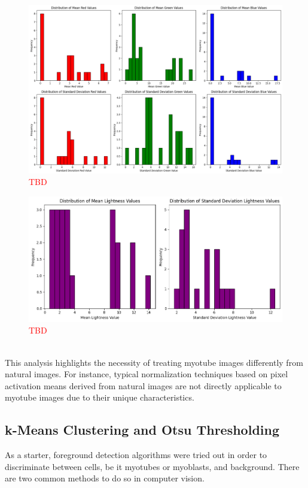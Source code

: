 \begin{figure}
	\centering
	\includegraphics[width=\textwidth]{"images/pixel_distribution_plots_rgb.png"}
	\caption[TBD]{\textcolor{red}{TBD}}
	\label{fig2}
\end{figure}
\begin{figure}
	\centering
	\includegraphics[width=\textwidth]{"images/pixel_distribution_plots_hsl.png"}
	\caption[TBD]{\textcolor{red}{TBD}}
	\label{fig3}
\end{figure}
\ \\
This analysis highlights the necessity of treating myotube images differently from natural images. For instance, typical normalization techniques based on pixel activation means derived from natural images are not directly applicable to myotube images due to their unique characteristics.

\subsection{k-Means Clustering and Otsu Thresholding}
As a starter, foreground detection algorithms were tried out in order to discriminate between cells, be it myotubes or myoblasts, and background. There are two common methods to do so in computer vision. 

